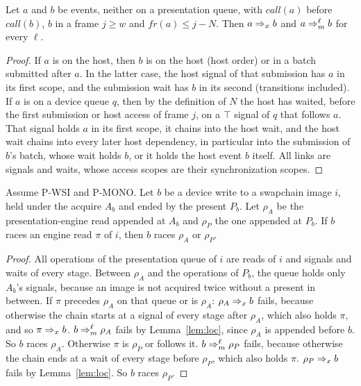 \begin{lemma}[Retirement, W.2]\label{lem:ret}
Let $a$ and $b$ be events, neither on a presentation queue, with $\mathit{call}(a)$ before $\mathit{call}(b)$, $b$ in a
frame $j \ge w$ and $\mathit{fr}(a) \le j - N$. Then $a \Rightarrow_{x} b$ and $a \Rightarrow_{m}^{\ell} b$ for every $\ell$.
\end{lemma}
\begin{proof}
If $a$ is on the host, then $b$ is on the host (host order) or in a batch submitted after $a$. In the latter case, the
host signal of that submission has $a$ in its first scope, and the submission wait has $b$ in its second (transitions
included). If $a$ is on a device queue $q$, then by the definition of $N$ the host has waited, before the first
submission or host access of frame $j$, on a $\top$ signal of $q$ that follows $a$. That signal holds $a$ in its first
scope, it chains into the host wait, and the host wait chains into every later host dependency, in particular into
the submission of $b$'s batch, whose wait holds $b$, or it holds the host event $b$ itself. All links are signals and
waits, whose access scopes are their synchronization scopes.
\end{proof}

\begin{lemma}[Presentation, W.3]\label{lem:pres}
Assume P-WSI and P-MONO. Let $b$ be a device write to a swapchain image $i$, held under the acquire $A_b$ and ended
by the present $P_b$. Let $\rho_A$ be the presentation-engine read appended at $A_b$ and $\rho_P$ the one appended at
$P_b$. If $b$ races an engine read $\pi$ of $i$, then $b$ races $\rho_A$ or $\rho_P$.
\end{lemma}
\begin{proof}
All operations of the presentation queue of $i$ are reads of $i$ and signals and waits of every stage. Between $\rho_A$
and the operations of $P_b$, the queue holds only $A_b$'s signals, because an image is not acquired twice without a
present in between. If $\pi$ precedes $\rho_A$ on that queue or is $\rho_A$: $\rho_A \Rightarrow_{x} b$ fails, because otherwise
the chain starts at a signal of every stage after $\rho_A$, which also holds $\pi$, and so $\pi \Rightarrow_{x} b$.
$b \Rightarrow_{m}^{\ell} \rho_A$ fails by Lemma~\ref{lem:loc}, since $\rho_A$ is appended before $b$. So $b$ races $\rho_A$.
Otherwise $\pi$ is $\rho_P$ or follows it. $b \Rightarrow_{m}^{\ell} \rho_P$ fails, because otherwise the chain ends at a wait
of every stage before $\rho_P$, which also holds $\pi$. $\rho_P \Rightarrow_{x} b$ fails by Lemma~\ref{lem:loc}. So $b$ races
$\rho_P$.
\end{proof}

